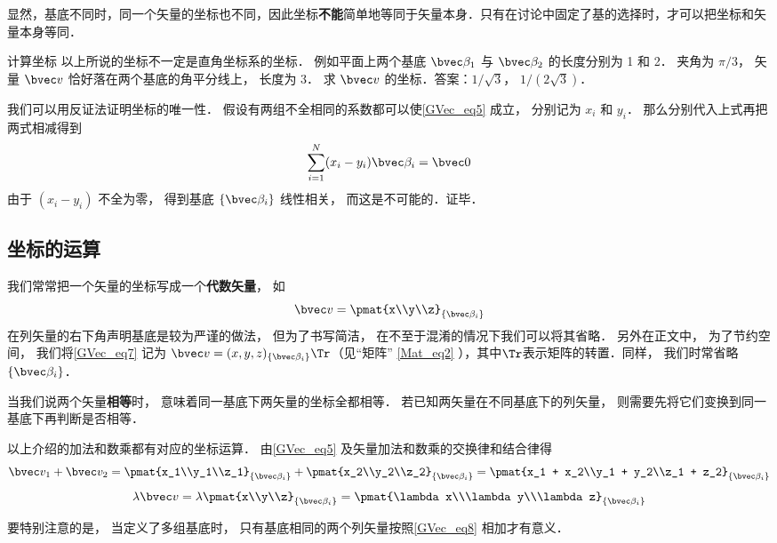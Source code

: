 显然，基底不同时，同一个矢量的坐标也不同，因此坐标\textbf{不能}简单地等同于矢量本身．只有在讨论中固定了基的选择时，才可以把坐标和矢量本身等同．

\begin{exercise}{计算坐标}
以上所说的坐标不一定是直角坐标系的坐标． 例如平面上两个基底 $\bvec \beta_1$ 与 $\bvec \beta_2$ 的长度分别为 1 和 2． 夹角为 $\pi/3$， 矢量 $\bvec v$ 恰好落在两个基底的角平分线上， 长度为 3． 求 $\bvec v$ 的坐标．答案：$1/\sqrt 3$， $1/(2\sqrt 3)$．
\end{exercise}

我们可以用反证法证明坐标的唯一性． 假设有两组不全相同的系数都可以使\autoref{GVec_eq5} 成立， 分别记为 $x_i$ 和 $y_i$． 那么分别代入上式再把两式相减得到
\begin{equation}
\sum_{i=1}^N (x_i-y_i) \bvec \beta_i = \bvec 0
\end{equation}
由于 $(x_i-y_i)$ 不全为零， 得到基底 $\{\bvec \beta_i\}$ 线性相关， 而这是不可能的．证毕．

\subsection{坐标的运算}
我们常常把一个矢量的坐标写成一个\textbf{代数矢量}， 如
\begin{equation}\label{GVec_eq7}
\bvec v = \pmat{x\\y\\z}_{\{\bvec\beta_i\}}
\end{equation}
在列矢量的右下角声明基底是较为严谨的做法， 但为了书写简洁， 在不至于混淆的情况下我们可以将其省略． 另外在正文中， 为了节约空间， 我们将\autoref{GVec_eq7} 记为 $\bvec v = (x, y, z)_{\{\bvec\beta_i\}}\Tr$（见“矩阵” \autoref{Mat_eq2} ），其中$\Tr$表示矩阵的转置．同样， 我们时常省略 $\{\bvec\beta_i\}$．

当我们说两个矢量\textbf{相等}时， 意味着同一基底下两矢量的坐标全都相等． 若已知两矢量在不同基底下的列矢量， 则需要先将它们变换到同一基底下再判断是否相等．

以上介绍的加法和数乘都有对应的坐标运算． 由\autoref{GVec_eq5} 及矢量加法和数乘的交换律和结合律得
\begin{equation}\label{GVec_eq8}
\bvec v_1 + \bvec v_2 = \pmat{x_1\\y_1\\z_1}_{\{\bvec\beta_i\}} + \pmat{x_2\\y_2\\z_2}_{\{\bvec\beta_i\}} = \pmat{x_1 + x_2\\y_1 + y_2\\z_1 + z_2}_{\{\bvec\beta_i\}}
\end{equation}
\begin{equation}\label{GVec_eq9}
\lambda \bvec v = \lambda\pmat{x\\y\\z}_{\{\bvec\beta_i\}} = \pmat{\lambda x\\\lambda y\\\lambda z}_{\{\bvec\beta_i\}}
\end{equation}

要特别注意的是， 当定义了多组基底时， 只有基底相同的两个列矢量按照\autoref{GVec_eq8} 相加才有意义．
